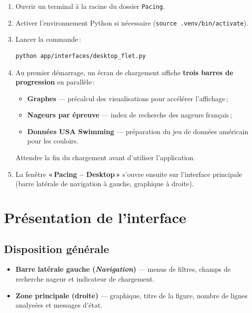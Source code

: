 \documentclass[11pt,a4paper]{article}
\begin{document}
\begin{enumerate}
  \item Ouvrir un terminal à la racine du dossier \texttt{Pacing}.
  \item Activer l'environnement Python si nécessaire (\texttt{source .venv/bin/activate}).
  \item Lancer la commande\,:
  \begin{verbatim}
python app/interfaces/desktop_flet.py
  \end{verbatim}
  \item Au premier démarrage, un écran de chargement affiche \textbf{trois barres de progression} en parallèle\,:
  \begin{itemize}
    \item \textbf{Graphes} --- précalcul des visualisations pour accélérer l'affichage\,;
    \item \textbf{Nageurs par épreuve} --- index de recherche des nageurs français\,;
    \item \textbf{Données USA Swimming} --- préparation du jeu de données américain pour les couloirs.
  \end{itemize}
  Attendre la fin du chargement avant d'utiliser l'application.
  \item La fenêtre \textbf{«\,Pacing -- Desktop\,»} s'ouvre ensuite sur l'interface principale (barre latérale de navigation à gauche, graphique à droite).
\end{enumerate}

\section{Présentation de l'interface}

\subsection{Disposition générale}

\begin{itemize}
  \item \textbf{Barre latérale gauche (\emph{Navigation})} --- menus de filtres, champs de recherche nageur et indicateur de chargement.
  \item \textbf{Zone principale (droite)} --- graphique, titre de la figure, nombre de lignes analysées et messages d'état.
\end{itemize}
\end{document}
